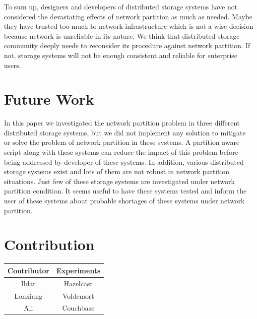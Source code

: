 \documentclass[a4paper]{article}
\begin{document}
To sum up, designers and developers of distributed storage systems have not considered the devastating effects of network partition as much as needed.
Maybe they have trusted too much to network infrastructure which is not a wise decision because network is unreliable in its nature.
We think that distributed storage community deeply needs to reconsider its procedure against network partition.
If not, storage systems will not be enough consistent and reliable for enterprise users.


\section{Future Work}
In this paper we investigated the network partition problem in three different distributed storage systems, but we did not implement any solution to mitigate or solve the problem of network partition in these systems. 
A partition aware script along with these systems can reduce the impact of this problem before being addressed by developer of these systems.
In addition, various distributed storage systems exist and lots of them are not robust in network partition situations.
Just few of these storage systems are investigated under network partition condition.
It seems useful to have these systems tested and inform the user of these systems about probable shortages of these systems under network partition.


\section*{Contribution}

\begin{table}[h]
	\centering
	\begin{tabular}{|c|c|}
		\hline
		\rowcolor{light-gray} \textbf{Contributor} & \textbf{Experiments} \\ \hline
		Ildar & Hazelcast  \\ \hline
		Lonxiang & Voldemort  \\ \hline
		Ali & Couchbase  \\ \hline
	\end{tabular}
\end{table}

\printbibliography
\end{document}
